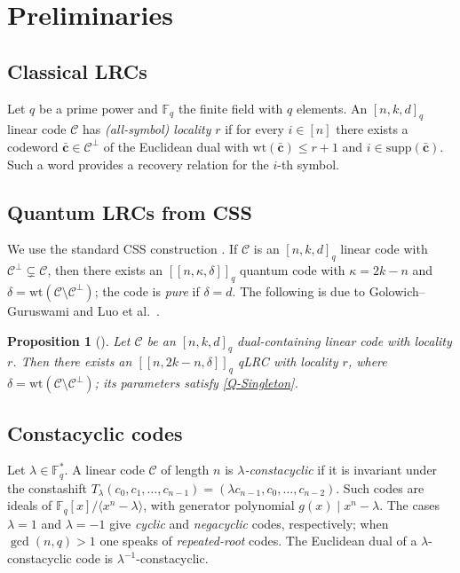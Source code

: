 \documentclass[journal,onecolumn]{IEEEtran}
\newtheorem{prop}[thm]{Proposition}
\newcommand{\Ff}{{\mathbb F}}
\newcommand{\cc}{{\mathcal C}}
\newcommand{\dsb}[1]{[\![#1]\!]}
\begin{document}
\section{Preliminaries}\label{sec:pre}

\subsection{Classical LRCs}

Let $q$ be a prime power and $\Ff_q$ the finite field with $q$ elements. An $[n,k,d]_q$ linear code $\cc$ has \emph{(all-symbol) locality} $r$ if for every $i\in[n]$ there exists a codeword $\bar{\mathbf c}\in\cc^{\perp}$ of the Euclidean dual with $\mathrm{wt}(\bar{\mathbf c})\le r+1$ and $i\in\mathrm{supp}(\bar{\mathbf c})$. Such a word provides a recovery relation for the $i$-th symbol.

\subsection{Quantum LRCs from CSS}

We use the standard CSS construction \cite{Ketkar2006}. If $\cc$ is an $[n,k,d]_q$ linear code with $\cc^{\perp}\subsetneq \cc$, then there exists an $\dsb{n,\kappa,\delta}_q$ quantum code with $\kappa=2k-n$ and $\delta=\mathrm{wt}(\cc\setminus\cc^\perp)$; the code is \emph{pure} if $\delta=d$. The following is due to Golowich--Guruswami \cite{Golowich2023} and Luo et al.~\cite[Corollary~1]{Luo2023}.

\begin{prop}[{\cite[Corollary~1]{Luo2023}}]\label{prop:css}
Let $\cc$ be an $[n,k,d]_q$ dual-containing linear code with locality $r$. Then there exists an $\dsb{n,2k-n,\delta}_q$ qLRC with locality $r$, where $\delta=\mathrm{wt}(\cc\setminus\cc^\perp)$; its parameters satisfy \eqref{Q-Singleton}.
\end{prop}

\subsection{Constacyclic codes}

Let $\lambda\in\Ff_q^*$. A linear code $\cc$ of length $n$ is \emph{$\lambda$-constacyclic} if it is invariant under the constashift $T_\lambda(c_0,c_1,\dots,c_{n-1})=(\lambda c_{n-1},c_0,\dots,c_{n-2})$. Such codes are ideals of $\Ff_q[x]/\langle x^n-\lambda\rangle$, with generator polynomial $g(x)\mid x^n-\lambda$. The cases $\lambda=1$ and $\lambda=-1$ give \emph{cyclic} and \emph{negacyclic} codes, respectively; when $\gcd(n,q)>1$ one speaks of \emph{repeated-root} codes. The Euclidean dual of a $\lambda$-constacyclic code is $\lambda^{-1}$-constacyclic.
\end{document}
